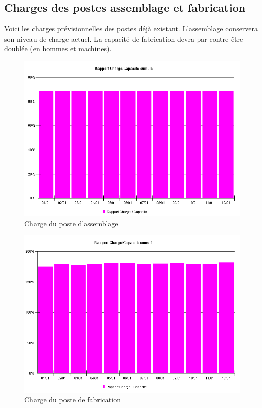 \documentclass[a4paper]{TPInsa}
\begin{document}
	\subsection{Charges des postes assemblage et fabrication}
	Voici les charges prévisionnelles des postes déjà existant. L'assemblage conservera son niveau de charge actuel. La capacité de fabrication devra par contre être doublée (en hommes et machines). 
	
	\begin{figure}[H]
	\centering
	\includegraphics[scale=0.6]{captures/charge_ass.PNG}
	\caption{Charge du poste d'assemblage}
	\end{figure}
	
	\begin{figure}[H]
	\centering
	\includegraphics[scale=0.6]{captures/charge_fab.PNG}
	\caption{Charge du poste de fabrication}
	\end{figure}
	
\end{document}
